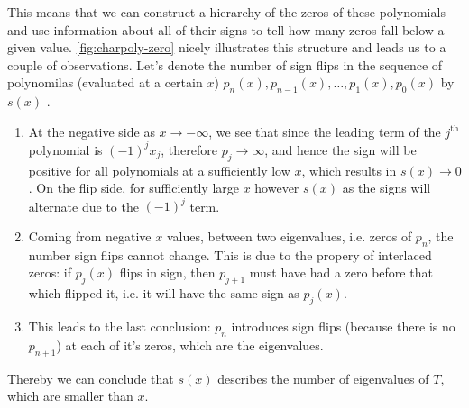 \documentclass{article}
\begin{document}
 This means that we can construct a hierarchy of the zeros of these polynomials and use information about all of their signs to tell how many zeros fall below a given value. \autoref{fig:charpoly-zero} nicely illustrates this structure and leads us to a couple of observations. Let's denote the number of sign flips in the sequence of polynomilas (evaluated at a certain $x$) $p_n(x), p_{n-1}(x), \dots, p_1(x), p_0(x)$ by $s(x)$ . 
 \begin{enumerate}
 	\item At the negative side as $x \to -\infty$, we see that since the leading term of the $j^{\mathrm{th}}$ polynomial is $\left(-1\right)^j x_j$, therefore $p_j \to \infty$, and hence the sign will be positive for all polynomials at a sufficiently low $x$, which results in $s(x)\to0$. On the flip side, for sufficiently large $x$ however $s(x)$ as the signs will alternate due to the $\left(-1\right)^j$ term.
 	\item Coming from negative $x$ values, between two eigenvalues, i.e. zeros of $p_n$, the number sign flips cannot change. This is due to the propery of interlaced zeros: if $p_j(x)$ flips in sign, then $p_{j+1}$ must have had a zero before that which flipped it, i.e. it will have the same sign as $p_j(x)$.
 	\item This leads to the last conclusion: $p_n$ introduces sign flips (because there is no $p_{n+1}$) at each of it's zeros, which are the eigenvalues.
 \end{enumerate}
 
 Thereby we can conclude that $s(x)$ describes the number of eigenvalues of $T$, which are smaller than $x$.
 
\end{document}
